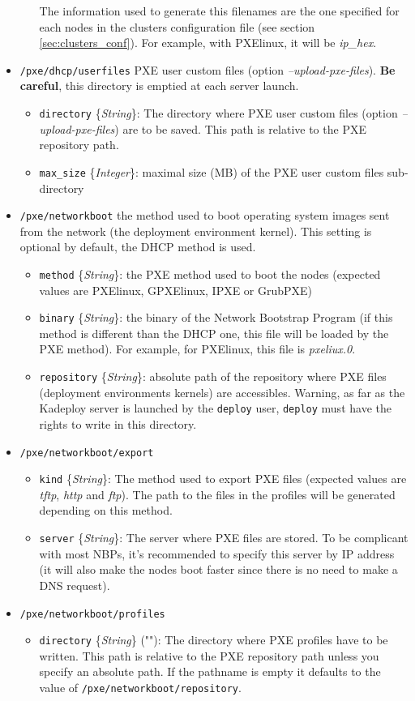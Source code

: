 \documentclass[a4wide,10pt,oneside]{book}
\newcommand{\ypath}[1]{\texttt{#1}}
\newcommand{\yfield}[2]{\texttt{#1} {\small\{{\emph{#2}}\}}:}
\newcommand{\yfieldd}[3]{\texttt{#1} {\small\{{\emph{#2}}\}} {\small(}#3{\small)}:}
\begin{document}
\begin{itemize}
\begin{itemize}
The information used to generate this filenames are the one specified for each nodes in the clusters configuration file (see section \ref{sec:clusters_conf}). For example, with PXElinux, it will be \emph{ip\_hex}.
  \end{itemize}
  \item \ypath{/pxe/dhcp/userfiles} PXE user custom files (option \emph{--upload-pxe-files}). \textbf{Be careful}, this directory is emptied at each server launch.
  \begin{itemize}
    \item \yfield{directory}{String} The directory where PXE user custom files (option \emph{--upload-pxe-files}) are to be saved. This path is relative to the PXE repository path.
    \item \yfield{max\_size}{Integer} maximal size (MB) of the PXE user custom files sub-directory
   \end{itemize}

  \item \ypath{/pxe/networkboot} the method used to boot operating system images sent from the network (the deployment environment kernel). This setting is optional by default, the DHCP method is used.
  \begin{itemize}
    \item \yfield{method}{String} the PXE method used to boot the nodes (expected values are PXElinux, GPXElinux, IPXE or GrubPXE)
    \item \yfield{binary}{String} the binary of the Network Bootstrap Program (if this method is different than the DHCP one, this file will be loaded by the PXE method). For example, for PXElinux, this file is \emph{pxeliux.0}.
    \item \yfield{repository}{String} absolute path of the repository where PXE files (deployment environments kernels) are accessibles. Warning, as far as the Kadeploy server is launched by the \texttt{deploy} user, \texttt{deploy} must have the rights to write in this directory.
  \end{itemize}
  \item \ypath{/pxe/networkboot/export}
  \begin{itemize}
    \item \yfield{kind}{String} The method used to export PXE files (expected values are \emph{tftp}, \emph{http} and \emph{ftp}). The path to the files in the profiles will be generated depending on this method.
    \item \yfield{server}{String} The server where PXE files are stored. To be complicant with most NBPs, it's recommended to specify this server by IP address (it will also make the nodes boot faster since there is no need to make a DNS request).
  \end{itemize}
  \item \ypath{/pxe/networkboot/profiles}
  \begin{itemize}
    \item \yfieldd{directory}{String}{""} The directory where PXE profiles have to be written. This path is relative to the PXE repository path unless you specify an absolute path. If the pathname is empty it defaults to the value of \ypath{/pxe/networkboot/repository}.


\end{itemize}
\end{itemize}
\end{document}
